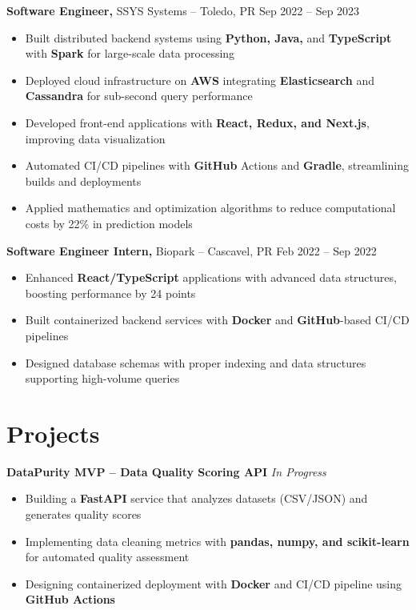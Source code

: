 \documentclass[11pt]{article}
\begin{document}
\vspace{-4pt}

\textbf{Software Engineer,} {SSYS Systems} -- Toledo, PR \hfill Sep 2022 -- Sep 2023 \\
\vspace{-9pt}
\begin{itemize}
  \item Built distributed backend systems using \textbf{Python, Java,} and \textbf{TypeScript} with \textbf{Spark} for large-scale data processing
  \item Deployed cloud infrastructure on \textbf{AWS} integrating \textbf{Elasticsearch} and \textbf{Cassandra} for sub-second query performance
  \item Developed front-end applications with \textbf{React, Redux, and Next.js}, improving data visualization
  \item Automated CI/CD pipelines with \textbf{GitHub} Actions and \textbf{Gradle}, streamlining builds and deployments
  \item Applied mathematics and optimization algorithms to reduce computational costs by 22\% in prediction models
\end{itemize}

\vspace{-4pt}

\textbf{Software Engineer Intern,} {Biopark} -- Cascavel, PR \hfill Feb 2022 -- Sep 2022 \\
\vspace{-9pt}
\begin{itemize}
  \item Enhanced \textbf{React/TypeScript} applications with advanced data structures, boosting performance by 24 points
  \item Built containerized backend services with \textbf{Docker} and \textbf{GitHub}-based CI/CD pipelines
  \item Designed database schemas with proper indexing and data structures supporting high-volume queries
\end{itemize}

\vspace{-25pt}

\section*{Projects}
\textbf{DataPurity MVP – Data Quality Scoring API} \hfill \textit{In Progress} \\
\vspace{-9pt}
\begin{itemize}
  \item Building a \textbf{FastAPI} service that analyzes datasets (CSV/JSON) and generates quality scores
  \item Implementing data cleaning metrics with \textbf{pandas, numpy, and scikit-learn} for automated quality assessment
  \item Designing containerized deployment with \textbf{Docker} and CI/CD pipeline using \textbf{GitHub Actions}
\end{itemize}
\end{document}
